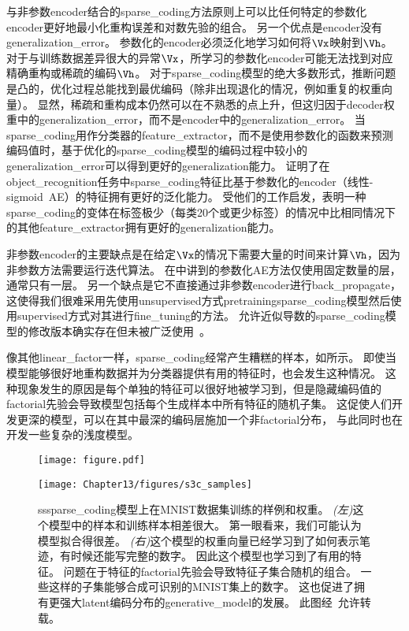 与非参数\gls{encoder}结合的\gls{sparse_coding}方法原则上可以比任何特定的参数化\gls{encoder}更好地最小化重构误差和对数先验的组合。
另一个优点是\gls{encoder}没有\gls{generalization_error}。
参数化的\gls{encoder}必须泛化地学习如何将$\Vx$映射到$\Vh$。
对于与训练数据差异很大的异常$\Vx$，所学习的参数化\gls{encoder}可能无法找到对应精确重构或稀疏的编码$\Vh$。
对于\gls{sparse_coding}模型的绝大多数形式，推断问题是凸的，优化过程总能找到最优编码（除非出现退化的情况，例如重复的权重向量）。
显然，稀疏和重构成本仍然可以在不熟悉的点上升，但这归因于\gls{decoder}权重中的\gls{generalization_error}，而不是\gls{encoder}中的\gls{generalization_error}。
当\gls{sparse_coding}用作分类器的\gls{feature_extractor}，而不是使用参数化的函数来预测编码值时，基于优化的\gls{sparse_coding}模型的编码过程中较小的\gls{generalization_error}可以得到更好的\gls{generalization}能力。
\citet{Coates2011b}证明了在\gls{object_recognition}任务中\gls{sparse_coding}特征比基于参数化的\gls{encoder}（线性-\gls{sigmoid}~\gls{AE}）的特征拥有更好的泛化能力。
受他们的工作启发，\citet{Goodfeli-et-al-TPAMI-Deep-PrePrint-2013-small}表明一种\gls{sparse_coding}的变体在标签极少（每类20个或更少标签）的情况中比相同情况下的其他\gls{feature_extractor}拥有更好的\gls{generalization}能力。



非参数\gls{encoder}的主要缺点是在给定$\Vx$的情况下需要大量的时间来计算$\Vh$，因为非参数方法需要运行迭代算法。
在中讲到的参数化\gls{AE}方法仅使用固定数量的层，通常只有一层。
另一个缺点是它不直接通过非参数\gls{encoder}进行\gls{back_propagate}，这使得我们很难采用先使用\gls{unsupervised}方式\gls{pretraining}\gls{sparse_coding}模型然后使用\gls{supervised}方式对其进行\gls{fine_tuning}的方法。
允许近似导数的\gls{sparse_coding}模型的修改版本确实存在但未被广泛使用~\citep{Bradley+Bagnell-2009-small}。

像其他\gls{linear_factor}一样，\gls{sparse_coding}经常产生糟糕的样本，如所示。
即使当模型能够很好地重构数据并为分类器提供有用的特征时，也会发生这种情况。
这种现象发生的原因是每个单独的特征可以很好地被学习到，但是隐藏编码值的\gls{factorial}先验会导致模型包括每个生成样本中所有特征的随机子集。
这促使人们开发更深的模型，可以在其中最深的编码层施加一个非\gls{factorial}分布， 与此同时也在开发一些复杂的浅度模型。

\begin{figure}[!htb]
\ifOpenSource
\centerline{\texttt{[image: figure.pdf]}}
\else
    \centerline{\texttt{[image: Chapter13/figures/s3c\_samples]}}
\fi
\caption{\gls{ss}\gls{sparse_coding}模型上在MNIST数据集训练的样例和权重。
\emph{(左)}这个模型中的样本和训练样本相差很大。
第一眼看来，我们可能认为模型拟合得很差。
\emph{(右)}这个模型的权重向量已经学习到了如何表示笔迹，有时候还能写完整的数字。
因此这个模型也学习到了有用的特征。
问题在于特征的\gls{factorial}先验会导致特征子集合随机的组合。
一些这样的子集能够合成可识别的MNIST集上的数字。
这也促进了拥有更强大\gls{latent}编码分布的\gls{generative_model}的发展。
此图经~\citet{Goodfeli-et-al-TPAMI-Deep-PrePrint-2013-small}允许转载。}
\label{fig:s3c_samples}
\end{figure}

